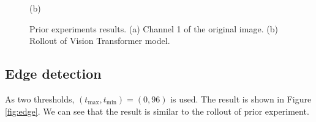 \documentclass{article}
\begin{document}
\begin{figure}[ht]
\begin{minipage}{0.49\hsize}
                \caption*{(b)}
            \end{minipage}
            \caption{
                Prior experiments results.
                (a) Channel 1 of the original image.
                (b) Rollout of Vision Transformer model.
            }
            \label{fig:vit}
        \end{figure}

    \subsection{Edge detection} \label{sec:edge}
        As two thresholds, $(t_\mathrm{max}, t_\mathrm{min}) = (0, 96)$ is used.
        The result is shown in Figure \ref{fig:edge}.
        We can see that the result is similar to the rollout of prior experiment.
\end{document}
